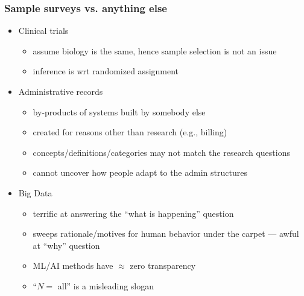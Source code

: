 \documentclass{beamer}
\begin{document}
\begin{frame}\frametitle{Sample surveys vs. anything else}

\begin{itemize}
    \item Clinical trials
        \begin{itemize}
            \item assume biology is the same, hence sample selection is not an issue
            \item inference is wrt randomized assignment
        \end{itemize}
    \item Administrative records
        \begin{itemize}
            \item by-products of systems built by somebody else
            \item created for reasons other than research (e.g., billing)
            \item concepts/definitions/categories may not match the research questions
            \item cannot uncover how people adapt to the admin structures
        \end{itemize}
    \item Big Data
        \begin{itemize}
            \item terrific at answering the ``what is happening'' question
            \item sweeps rationale/motives for human behavior under the carpet --- awful at ``why'' question
            \item ML/AI methods have $\approx$ zero transparency
            \item ``$N=$ all'' is a misleading slogan
        \end{itemize}
\end{itemize}

\end{frame}
\end{document}
